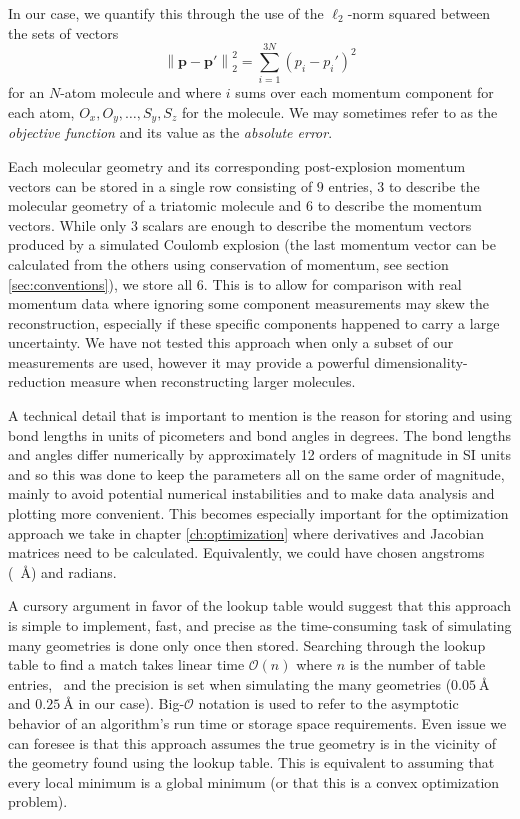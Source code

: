 In our case, we quantify this through the use of the $\ell_2$-norm squared between the sets of vectors
\begin{equation}
\left\|\mathbf{p} - \mathbf{p}'\right\|_2^2
= \sum\limits_{i = 1}^{3N} (p_i - p_i')^2
\end{equation}
for an $N$-atom molecule and where $i$ sums over each momentum component for each atom, \eg $O_x, O_y, \dots, S_y, S_z$ for the  molecule. We may sometimes refer to as the \emph{objective function} and its value as the \emph{absolute error}.


Each molecular geometry and its corresponding post-explosion momentum vectors can be stored in a single row consisting of $9$ entries, $3$ to describe the molecular geometry of a triatomic molecule and $6$ to describe the momentum vectors. While only $3$ scalars are enough to describe the momentum vectors produced by a simulated Coulomb explosion (the last momentum vector can be calculated from the others using conservation of momentum, see section \ref{sec:conventions}), we store all $6$. This is to allow for comparison with real momentum data where ignoring some component measurements may skew the reconstruction, especially if these specific components happened to carry a large uncertainty. We have not tested this approach when only a subset of our measurements are used, however it may provide a powerful dimensionality-reduction measure when reconstructing larger molecules.

A technical detail that is important to mention is the reason for storing and using bond lengths in units of picometers and bond angles in degrees. The bond lengths and angles differ numerically by approximately 12 orders of magnitude in SI units and so this was done to keep the parameters all on the same order of magnitude, mainly to avoid potential numerical instabilities and to make data analysis and plotting more convenient. This becomes especially important for the optimization approach we take in chapter \ref{ch:optimization} where derivatives and Jacobian matrices need to be calculated. Equivalently, we could have chosen angstroms (\SI{}{\angstrom}) and radians.

A cursory argument in favor of the lookup table would suggest that this approach is simple to implement, fast, and precise as the time-consuming task of simulating many geometries is done only once then stored. Searching through the lookup table to find a match takes linear time $\mathcal{O}(n)$ where $n$ is the number of table entries,\footnotemark~ and the precision is set when simulating the many geometries ($\SI{0.05}{\angstrom}$ and $\SI{0.25}{\angstrom}$ in our case). Big-$\mathcal{O}$ notation is used to refer to the asymptotic behavior of an algorithm's run time or storage space requirements. Even issue we can foresee is that this approach assumes the true geometry is in the vicinity of the geometry found using the lookup table. This is equivalent to assuming that every local minimum is a global minimum (or that this is a convex optimization problem). %

